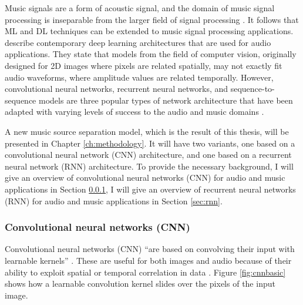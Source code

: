 \documentclass[report.tex]{subfiles}
\begin{document}
Music signals are a form of acoustic signal, and the domain of music signal processing is inseparable from the larger field of signal processing \parencite{musicsp}. It follows that ML and DL techniques can be extended to music signal processing applications. \textcite{audiodeeplearning} describe contemporary deep learning architectures that are used for audio applications. They state that models from the field of computer vision, originally designed for 2D images where pixels are related spatially, may not exactly fit audio waveforms, where amplitude values are related temporally. However, convolutional neural networks, recurrent neural networks, and sequence-to-sequence models are three popular types of network architecture that have been adapted with varying levels of success to the audio and music domains \parencite{audiodeeplearning}.

A new music source separation model, which is the result of this thesis, will be presented in Chapter \ref{ch:methodology}. It will have two variants, one based on a convolutional neural network (CNN) architecture, and one based on a recurrent neural network (RNN) architecture. To provide the necessary background, I will give an overview of convolutional neural networks (CNN) for audio and music applications in Section \ref{sec:cnn}, I will give an overview of recurrent neural networks (RNN) for audio and music applications in Section \ref{sec:rnn}.

\subsubsection{Convolutional neural networks (CNN)}
\label{sec:cnn}

Convolutional neural networks (CNN) ``are based on convolving their input with learnable kernels'' \parencite[3]{audiodeeplearning}. These are useful for both images and audio because of their ability to exploit spatial or temporal correlation in data \parencite{cnns}. Figure \ref{fig:cnnbasic} shows how a learnable convolution kernel slides over the pixels of the input image.
\end{document}
